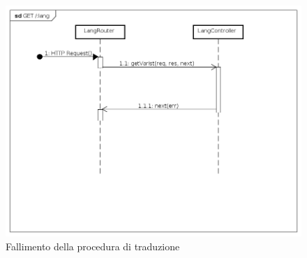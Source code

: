 \begin{itemize}
\label{Fallimento della procedura di traduzione}
\begin{figure}[ht]
	\centering
	\includegraphics[scale=0.40]{UML/DiagrammiDiSequenza/Back-end/GET_lang_failure.png}
	\caption{Fallimento della procedura di traduzione}
\end{figure}
\FloatBarrier
\end{itemize}


